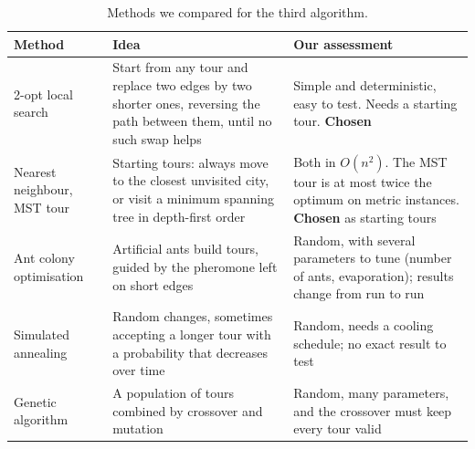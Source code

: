 \documentclass[10pt,a4paper]{article}
\begin{document}
\begin{table}[H]
\centering\footnotesize
\begin{tabularx}{\linewidth}{@{}L{3.1cm} Y Y@{}}
\toprule
Method & Idea & Our assessment \\
-opt local search & Start from any tour and replace two edges by two shorter ones, reversing the path between them, until no such swap helps & Simple and deterministic, easy to test. Needs a starting tour. \textbf{Chosen} \\
Nearest neighbour, MST tour & Starting tours: always move to the closest unvisited city, or visit a minimum spanning tree in depth-first order & Both in $O(n^2)$. The MST tour is at most twice the optimum on metric instances. \textbf{Chosen} as starting tours \\
Ant colony optimisation & Artificial ants build tours, guided by the pheromone left on short edges & Random, with several parameters to tune (number of ants, evaporation); results change from run to run \\
Simulated annealing & Random changes, sometimes accepting a longer tour with a probability that decreases over time & Random, needs a cooling schedule; no exact result to test \\
Genetic algorithm & A population of tours combined by crossover and mutation & Random, many parameters, and the crossover must keep every tour valid \\
\bottomrule
\end{tabularx}
\caption{Methods we compared for the third algorithm.}
\label{tab-candidates}
\end{table}
\end{document}
